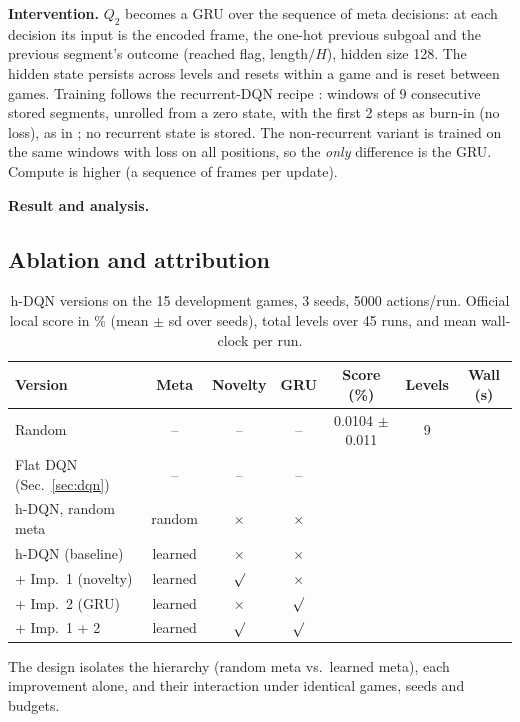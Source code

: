\textbf{Intervention.} $Q_2$ becomes a GRU \citep{cho2014gru} over the sequence of
meta decisions: at each decision its input is the encoded frame, the one-hot
previous subgoal and the previous segment's outcome (reached flag, length$/H$),
hidden size 128. The hidden state persists across levels and resets within a game
and is reset between games. Training follows the recurrent-DQN recipe
\citep{hausknecht2015drqn}: windows of 9 consecutive stored segments, unrolled from a
zero state, with the first 2 steps as burn-in (no loss), as in
\citet{kapturowski2019r2d2}; no recurrent state is stored. The non-recurrent
variant is trained on the same windows with loss on all positions, so the
\emph{only} difference is the GRU. Compute is higher (a sequence of
frames per update).

\textbf{Result and analysis.} 

\subsection{Ablation and attribution}
\begin{table}[t]
\centering\footnotesize\setlength{\tabcolsep}{3pt}
\caption{h-DQN versions on the 15 development games, 3 seeds, 5000 actions/run.
Official local score in \% (mean $\pm$ sd over seeds), total levels over 45 runs,
and mean wall-clock per run. }
\label{tab:hdqn-ablation}
\begin{tabular}{lcccccc}
\toprule
Version & Meta & Novelty & GRU & Score (\%) & Levels & Wall (s) \\
\midrule
Random             & --         & --         & --         & 0.0104 $\pm$ 0.011 & 9 & \todo{} \\
Flat DQN (Sec.~\ref{sec:dqn}) & -- & -- & -- & \todo{} & \todo{} & \todo{} \\
h-DQN, random meta & random     & $\times$   & $\times$   & \todo{} & \todo{} & \todo{} \\
h-DQN (baseline)   & learned    & $\times$   & $\times$   & \todo{} & \todo{} & \todo{} \\
+ Imp.\ 1 (novelty)& learned    & $\surd$    & $\times$   & \todo{} & \todo{} & \todo{} \\
+ Imp.\ 2 (GRU)    & learned    & $\times$   & $\surd$    & \todo{} & \todo{} & \todo{} \\
+ Imp.\ 1 + 2      & learned    & $\surd$    & $\surd$    & \todo{} & \todo{} & \todo{} \\
\bottomrule
\end{tabular}
\end{table}
The design isolates the hierarchy (random meta vs.\ learned meta), each
improvement alone, and their interaction under identical games, seeds and
budgets. 

